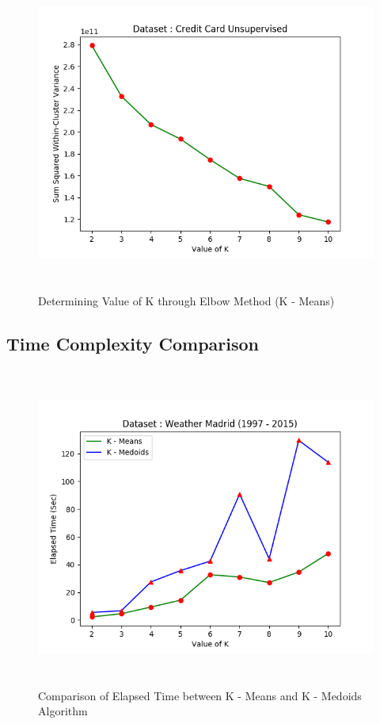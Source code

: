 \documentclass[12pt]{article}
\begin{document}
\begin{figure}[H]
	\centering
	\includegraphics[width = \linewidth, height = 10.5cm]{Elbow_CreditCard.png}
	\caption{Determining Value of K through Elbow Method (K - Means)}
	\label{fig:elbow_credit}
\end{figure}

\subsection{Time Complexity Comparison}

\begin{figure}[H]
	\centering
	\includegraphics[width = \linewidth, height = 10.5cm]{Weather.png}
	\caption{Comparison of Elapsed Time between K - Means and K - Medoids Algorithm}
	\label{fig:weather}
\end{figure}
\end{document}
